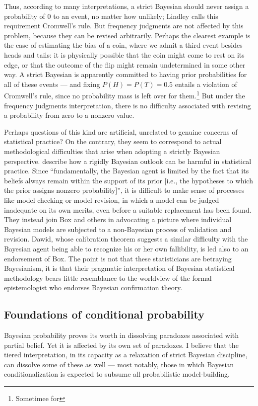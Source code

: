 \documentclass[letterpaper,12pt]{article}
\begin{document}
Thus, according to many interpretations, a strict Bayesian should never assign a probability of $0$ to an event, no matter how unlikely; Lindley calls this requirement Cromwell's rule. But frequency judgments are not affected by this problem, because they can be revised arbitrarily. Perhaps the clearest example is the case of estimating the bias of a coin, where we admit a third event besides heads and tails: it is physically possible that the coin might come to rest on its edge, or that the outcome of the flip might remain undetermined in some other way. A strict Bayesian is apparently committed to having prior probabilities for all of these events --- and fixing $P(H) = P(T) = 0.5$ entails a violation of Cromwell's rule, since no probability mass is left over for them.\footnote{Sometimee \cite{fitelson2008bayesians} for } But under the frequency judgments interpretation, there is no difficulty associated with revising a probability from zero to a nonzero value.

Perhaps questions of this kind are artificial, unrelated to genuine concerns of statistical practice? On the contrary, they seem to correspond to actual methodological difficulties that arise when adopting a strictly Bayesian perspective. \cite{Gelman2012-GELPAT} describe how a rigidly Bayesian outlook can be harmful in statistical practice. Since ``fundamentally, the Bayesian agent is limited by the fact that its beliefs always remain within the support of its prior [i.e., the hypotheses to which the prior assigns nonzero probability]'', it is difficult to make sense of processes like model checking or model revision, in which a model can be judged inadequate on its own merits, even before a suitable replacement has been found. They instead join Box and others in advocating a picture where individual Bayesian models are subjected to a non-Bayesian process of validation and revision. Dawid, whose calibration theorem suggests a similar difficulty with the Bayesian agent being able to recognize his or her own fallibility, is led also to an endorsement of Box. The point is not that these statisticians are betraying Bayesianism, it is that their pragmatic interpretation of Bayesian statistical methodology bears little resemblance to the worldview of the formal epistemologist who endorses Bayesian confirmation theory.

\subsection{Foundations of conditional probability}
\label{sec:conditionalFoundations}
Bayesian probability proves its worth in dissolving paradoxes associated with partial belief. Yet it is affected by its own set of paradoxes. I believe that the tiered interpretation, in its capacity as a relaxation of strict Bayesian discipline, can dissolve some of these as well --- most notably, those in which Bayesian conditionalization is expected to subsume all probabilistic model-building.
\end{document}
